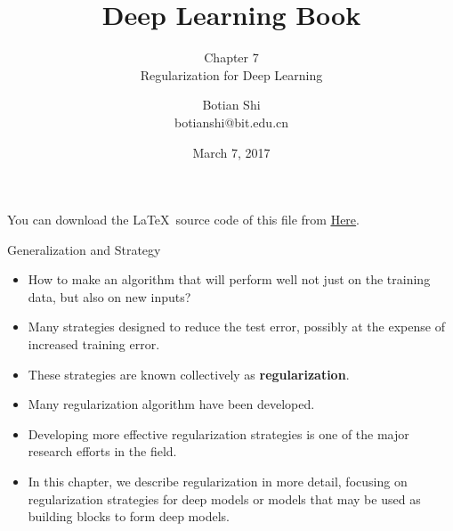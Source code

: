 \documentclass[10pt]{beamer}
\begin{document}
	\title{Deep Learning Book}
	\subtitle{Chapter 7 \\ Regularization for Deep Learning}
	\author{Botian Shi \\ botianshi@bit.edu.cn}
	\date{March 7, 2017}
	
	
	\begin{frame}[plain]
		\titlepage
	\end{frame}
	
	\begin{frame}
		You can download the \LaTeX\, source code of this file from \href{https://github.com/friskit-china/DLBookSlides}{\underline{Here}}.
	\end{frame}
	
	\begin{frame}{Generalization and Strategy}
		\begin{itemize}
			\item How to make an algorithm that will perform well not just on the training data, but also on new inputs?
			\pause
			\item Many strategies designed to reduce the test error, possibly at the expense of increased training error.
			\pause
			\item These strategies are known collectively as \textbf{regularization}.
			\pause
			\item Many regularization algorithm have been developed.
			\item Developing more effective regularization strategies is one of the major research efforts in the field.
			\pause
			\item In this chapter, we describe regularization in more detail, focusing on regularization strategies for deep models or models that may be used as building blocks to form deep models.
		\end{itemize}
	\end{frame}
	
\end{document}
